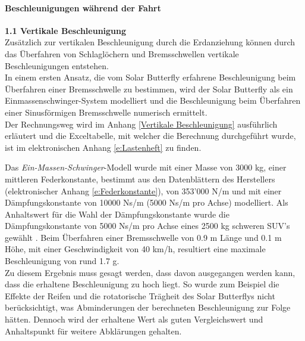   \paragraph{Beschleunigungen während der Fahrt}
  \begin{description}
    \item \textbf{1.1 Vertikale Beschleunigung}\\
    Zusätzlich zur vertikalen Beschleunigung durch die Erdanziehung können durch das Überfahren von Schlaglöchern und Bremsschwellen vertikale Beschleunigungen entstehen.\\
    In einem ersten Ansatz, die vom Solar Butterfly erfahrene Beschleunigung beim Überfahren einer Bremsschwelle zu bestimmen, wird der Solar Butterfly als ein Einmassenschwinger-System modelliert und die Beschleunigung beim Überfahren einer Sinusförmigen Bremsschwelle numerisch ermittelt.\\
    Der Rechnungsweg wird im Anhang \ref{Vertikale Beschleunigung} ausführlich erläutert und die Exceltabelle, mit welcher die Berechnung durchgeführt wurde, ist im elektronischen Anhang \ref{e:Lastenheft} zu finden.

    Das \emph{Ein-Massen-Schwinger}-Modell wurde mit einer Masse von 3000 kg, einer mittleren Federkonstante, bestimmt aus den Datenblättern des Herstellers (elektronischer Anhang \ref{e:Federkonstante}), von 353'000 N/m und mit einer Dämpfungskonstante von 10000 Ns/m (5000 Ns/m pro Achse) modelliert. Als Anhaltswert für die Wahl der Dämpfungskonstante wurde die Dämpfungskonstante von 5000 Ns/m pro Achse eines 2500 kg schweren SUV's gewählt \cite{Beschl.2}. Beim Überfahren einer Bremsschwelle von 0.9 m Länge und 0.1 m Höhe, mit einer Geschwindigkeit von 40 km/h, resultiert eine maximale Beschleunigung von rund 1.7 g.\\
    Zu diesem Ergebnis muss gesagt werden, dass davon ausgegangen werden kann, dass die erhaltene Beschleunigung zu hoch liegt. So wurde zum Beispiel die Effekte der Reifen und die rotatorische Trägheit des Solar Butterflys nicht berücksichtigt, was Abminderungen der berechneten Beschleunigung zur Folge hätten. Dennoch wird der erhaltene Wert als guten Vergleichswert und Anhaltspunkt für weitere Abklärungen gehalten.


\end{description}

